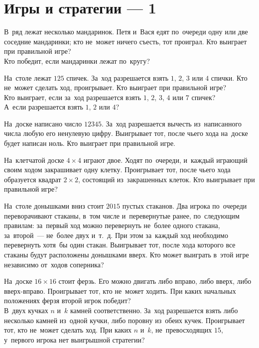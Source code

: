 
\section*{Игры и стратегии --- 1}


\begin{problems}

\item
\subproblem
В~ряд лежат несколько мандаринок.
Петя и~Вася едят по~очереди одну или две соседние мандаринки;
кто не~может ничего съесть, тот проиграл.
Кто выиграет при правильной игре?
\\
\subproblem
Кто победит, если мандаринки лежат по~кругу?

\item
\subproblem
На~столе лежат $125$ спичек.
За~ход разрешается взять $1$, $2$, $3$ или $4$ спички.
Кто не~может сделать ход, проигрывает.
Кто выиграет при правильной игре?
\\
\subproblem
Кто выиграет, если за~ход разрешается взять $1$, $2$, $3$, $4$ или $7$ спичек?
\\
\subproblem
А~если разрешается взять $1$, $2$ или $4$?

\item
На~доске написано число $12345$.
За~ход разрешается вычесть из~написанного числа любую его ненулевую цифру.
Выигрывает тот, после чьего хода на~доске будет написан ноль.
Кто выиграет при правильной игре.

\item
На~клетчатой доске $4 \times 4$ играют двое.
Ходят по~очереди, и~каждый играющий своим ходом закрашивает одну клетку.
Проигрывает тот, после чьего хода образуется квадрат $2 \times 2$, состоящий
из~закрашенных клеток.
Кто выигрывает при правильной игре?

\item
На~столе донышками вниз стоит $2015$ пустых стаканов.
Два игрока по~очереди переворачивают стаканы, в~том числе и~перевернутые ранее,
по~следующим правилам: за~первый ход можно  перевернуть не~более одного
стакана, за~второй~--- не~более двух и~т.~д.
При этом за~каждый ход необходимо перевернуть хотя~бы один стакан.
Выигрывает тот, после хода которого все стаканы будут расположены донышками
вверх.
Кто может выиграть в~этой игре независимо от~ходов соперника?

\item
\subproblem
На~доске $16 \times 16$ стоит ферзь.
Его можно двигать либо вправо, либо вверх, либо вверх-вправо.
Проигрывает тот, кто не~может ходить.
При каких начальных положениях ферзя второй игрок победит?
\\
\subproblem
В~двух кучках $n$ и~$k$ камней соответственно.
За~ход разрешается взять либо несколько камней из~одной кучки, либо поровну
из~обеих кучек.
Проигрывает тот, кто не~может сделать ход.
При каких $n$ и~$k$, не~превосходящих $15$, у~первого игрока нет выигрышной
стратегии?


\end{problems}

